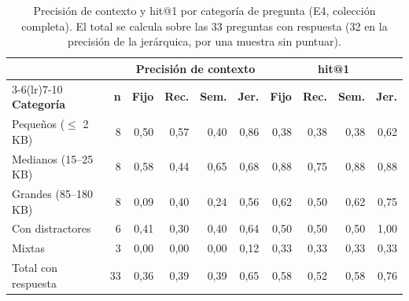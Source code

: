 \begin{table}[htbp]
\centering\small
\caption[Precisión de contexto y hit@1 por categoría de pregunta (E4)]{Precisión de contexto y hit@1 por categoría de pregunta (E4, colección completa). El total se calcula sobre las 33 preguntas con respuesta (32 en la precisión de la jerárquica, por una muestra sin puntuar).}
\label{tab:resultados-bateria}
\begin{tabular}{@{}l r rrrr rrrr@{}}
\toprule
& & \multicolumn{4}{c}{\textbf{Precisión de contexto}} & \multicolumn{4}{c}{\textbf{hit@1}} \\
\cmidrule(lr){3-6}\cmidrule(lr){7-10}
\textbf{Categoría} & \textbf{n} & \textbf{Fijo} & \textbf{Rec.} & \textbf{Sem.} & \textbf{Jer.} & \textbf{Fijo} & \textbf{Rec.} & \textbf{Sem.} & \textbf{Jer.} \\
\midrule
Pequeños ($\leq$ 2\,KB)   & 8 & 0,50 & 0,57 & 0,40 & 0,86 & 0,38 & 0,38 & 0,38 & 0,62 \\
Medianos (15--25\,KB)     & 8 & 0,58 & 0,44 & 0,65 & 0,68 & 0,88 & 0,75 & 0,88 & 0,88 \\
Grandes (85--180\,KB)     & 8 & 0,09 & 0,40 & 0,24 & 0,56 & 0,62 & 0,50 & 0,62 & 0,75 \\
Con distractores          & 6 & 0,41 & 0,30 & 0,40 & 0,64 & 0,50 & 0,50 & 0,50 & 1,00 \\
Mixtas                    & 3 & 0,00 & 0,00 & 0,00 & 0,12 & 0,33 & 0,33 & 0,33 & 0,33 \\
\midrule
Total con respuesta & 33 & 0,36 & 0,39 & 0,39 & 0,65 & 0,58 & 0,52 & 0,58 & 0,76 \\
\bottomrule
\end{tabular}
\end{table}

